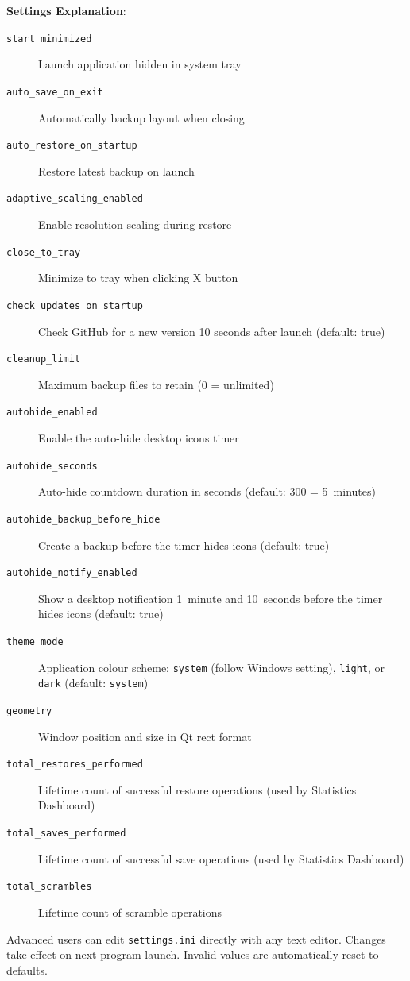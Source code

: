 \documentclass[a4paper,11pt]{article}
\begin{document}
\textbf{Settings Explanation}:
\begin{description}
  \item[\texttt{start\_minimized}] Launch application hidden in system tray
  \item[\texttt{auto\_save\_on\_exit}] Automatically backup layout when closing
  \item[\texttt{auto\_restore\_on\_startup}] Restore latest backup on launch
  \item[\texttt{adaptive\_scaling\_enabled}] Enable resolution
    scaling during restore
  \item[\texttt{close\_to\_tray}] Minimize to tray when clicking X button
  \item[\texttt{check\_updates\_on\_startup}] Check GitHub for a new
    version 10 seconds after launch (default: true)
  \item[\texttt{cleanup\_limit}] Maximum backup files to retain (0 = unlimited)
  \item[\texttt{autohide\_enabled}] Enable the auto-hide desktop icons timer
  \item[\texttt{autohide\_seconds}] Auto-hide countdown duration in seconds
    (default: 300 = 5~minutes)
  \item[\texttt{autohide\_backup\_before\_hide}] Create a backup before the
    timer hides icons (default: true)
  \item[\texttt{autohide\_notify\_enabled}] Show a desktop notification
    1~minute and 10~seconds before the timer hides icons (default: true)
  \item[\texttt{theme\_mode}] Application colour scheme:
    \texttt{system} (follow Windows setting), \texttt{light}, or
    \texttt{dark} (default: \texttt{system})
  \item[\texttt{geometry}] Window position and size in Qt rect format
  \item[\texttt{total\_restores\_performed}] Lifetime count of
    successful restore operations (used by Statistics Dashboard)
  \item[\texttt{total\_saves\_performed}] Lifetime count of
    successful save operations (used by Statistics Dashboard)
  \item[\texttt{total\_scrambles}] Lifetime count of scramble operations
\end{description}

\begin{infobox}
  Advanced users can edit \texttt{settings.ini} directly with any text editor.
  Changes take effect on next program launch. Invalid values are automatically
  reset to defaults.
\end{infobox}
\end{document}
